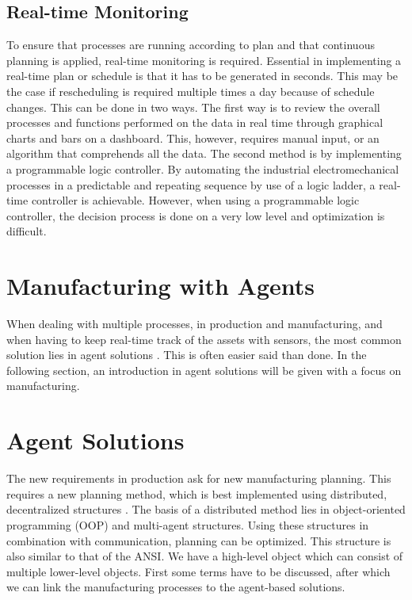 \subsection{Real-time Monitoring}
To ensure that processes are running according to plan and that continuous planning is applied, real-time monitoring is required. Essential in implementing a real-time plan or schedule is that it has to be generated in seconds. This may be the case if rescheduling is required multiple times a day because of schedule changes. This can be done in two ways. The first way is to review the overall processes and functions performed on the data in real time through graphical charts and bars on a dashboard. This, however, requires manual input, or an algorithm that comprehends all the data. The second method is by implementing a programmable logic controller. By automating the industrial electromechanical processes in a predictable and repeating sequence by use of a logic ladder, a real-time controller is achievable. However, when using a programmable logic controller, the decision process is done on a very low level and optimization is difficult.

\section*{Manufacturing with Agents}
When dealing with multiple processes, in production and manufacturing, and when having to keep real-time track of the assets with sensors, the most common solution lies in agent solutions \citep{leitao2013past, monostori2016cyber}. This is often easier said than done. In the following section, an introduction in agent solutions will be given with a focus on manufacturing.  

\newpage
\section{Agent Solutions}
The new requirements in production ask for new manufacturing planning. This requires a new planning method, which is best implemented using distributed, decentralized structures \citep{parunak1999industrial}. The basis of a distributed method lies in object-oriented programming (OOP) and multi-agent structures. Using these structures in combination with communication, planning can be optimized. This structure is also similar to that of the ANSI. We have a high-level object which can consist of multiple lower-level objects. First some terms have to be discussed, after which we can link the manufacturing processes to the agent-based solutions.


